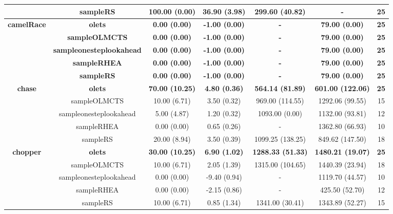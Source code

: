 \begin{table*}[!t]
\begin{center}
\begin{adjustbox}{width=1\textwidth}
\begin{tabular}{|c|c|c|c|c|c|c|}
\cline{2-7}
 & \textbf{sampleRS} & \textbf{100.00 (0.00)} & \textbf{36.90 (3.98)} & \textbf{299.60 (40.82)} & \textbf{ - } & \textbf{25}
 \\
\hline
\hline
\cline{2-7}
\multirow{5}{*}{\textbf{camelRace}} & \textbf{olets} & \textbf{0.00 (0.00)} & \textbf{-1.00 (0.00)} & \textbf{ - } & \textbf{79.00 (0.00)} & \textbf{25}
 \\
\cline{2-7}
 & \textbf{sampleOLMCTS} & \textbf{0.00 (0.00)} & \textbf{-1.00 (0.00)} & \textbf{ - } & \textbf{79.00 (0.00)} & \textbf{25}
 \\
\cline{2-7}
 & \textbf{sampleonesteplookahead} & \textbf{0.00 (0.00)} & \textbf{-1.00 (0.00)} & \textbf{ - } & \textbf{79.00 (0.00)} & \textbf{25}
 \\
\cline{2-7}
 & \textbf{sampleRHEA} & \textbf{0.00 (0.00)} & \textbf{-1.00 (0.00)} & \textbf{ - } & \textbf{79.00 (0.00)} & \textbf{25}
 \\
\cline{2-7}
 & \textbf{sampleRS} & \textbf{0.00 (0.00)} & \textbf{-1.00 (0.00)} & \textbf{ - } & \textbf{79.00 (0.00)} & \textbf{25}
 \\
\hline
\hline
\cline{2-7}
\multirow{5}{*}{\textbf{chase}} & \textbf{olets} & \textbf{70.00 (10.25)} & \textbf{4.80 (0.36)} & \textbf{564.14 (81.89)} & \textbf{601.00 (122.06)} & \textbf{25}
 \\
\cline{2-7}
 & sampleOLMCTS & 10.00 (6.71) & 3.50 (0.32) & 969.00 (114.55) & 1292.06 (99.55) & 15
 \\
\cline{2-7}
 & sampleonesteplookahead & 5.00 (4.87) & 1.20 (0.32) & 1093.00 (0.00) & 1132.00 (93.81) & 12
 \\
\cline{2-7}
 & sampleRHEA & 0.00 (0.00) & 0.65 (0.26) &  -  & 1362.80 (66.93) & 10
 \\
\cline{2-7}
 & sampleRS & 20.00 (8.94) & 3.50 (0.39) & 1099.25 (138.25) & 849.62 (147.50) & 18
 \\
\hline
\hline
\cline{2-7}
\multirow{5}{*}{\textbf{chopper}} & \textbf{olets} & \textbf{30.00 (10.25)} & \textbf{6.90 (1.02)} & \textbf{1288.33 (51.33)} & \textbf{1480.21 (19.07)} & \textbf{25}
 \\
\cline{2-7}
 & sampleOLMCTS & 10.00 (6.71) & 2.05 (1.39) & 1315.00 (104.65) & 1440.39 (23.94) & 18
 \\
\cline{2-7}
 & sampleonesteplookahead & 0.00 (0.00) & -9.40 (0.94) &  -  & 1119.70 (44.57) & 10
 \\
\cline{2-7}
 & sampleRHEA & 0.00 (0.00) & -2.15 (0.86) &  -  & 425.50 (52.70) & 12
 \\
\cline{2-7}
 & sampleRS & 10.00 (6.71) & 0.85 (1.34) & 1341.00 (30.41) & 1343.89 (52.27) & 15

\end{tabular}
\end{adjustbox}
\end{center}
\end{table*}

